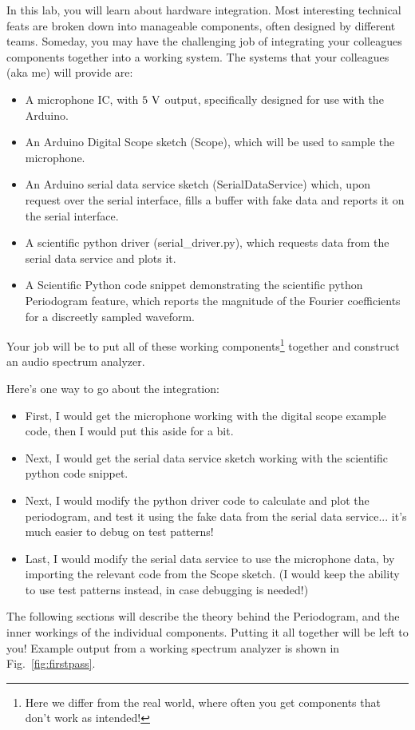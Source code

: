 \documentclass[12pt]{article}
\begin{document}
In this lab, you will learn about hardware integration.  Most interesting technical feats are broken down into manageable components, often designed by different teams.  Someday, you may have the challenging job of integrating your colleagues components together into a working system.   The systems that your colleagues (aka me) will provide are:
\begin{itemize}
\item A microphone IC, with $5~\rm V$ output, specifically designed for use with the Arduino.
\item An Arduino Digital Scope sketch (Scope), which will be used to sample the microphone.
\item An Arduino serial data service sketch (SerialDataService) which, upon request over the serial interface, fills a buffer with fake data and reports it on the serial interface.
\item A scientific python driver (serial\_driver.py), which requests data from the serial data service and plots it.
\item A Scientific Python code snippet demonstrating the scientific python Periodogram feature, which reports the magnitude of the Fourier coefficients for a discreetly sampled waveform.
\end{itemize}
Your job will be to put all of these working components\footnote{Here we differ from the real world, where often you get components that don't work as intended!} together and construct an audio spectrum analyzer. 

Here's one way to go about the integration:  
\begin{itemize}
\item First, I would get the microphone working with the digital scope example code, then I would put this aside for a bit.
\item Next, I would get the serial data service sketch working with the scientific python code snippet.
\item Next, I would modify the python driver code to calculate and plot the periodogram, and test it using the fake data from the serial data service... it's much easier to debug on test patterns!
\item Last, I would modify the serial data service to use the microphone data, by importing the relevant code from the Scope sketch.  (I would keep the ability to use test patterns instead, in case debugging is needed!)
\end{itemize}
The following sections will describe the theory behind the Periodogram, and the inner workings of the individual components.  Putting it all together will be left to you!  Example output from a working spectrum analyzer is shown in Fig.~\ref{fig:firstpass}.
\end{document}
